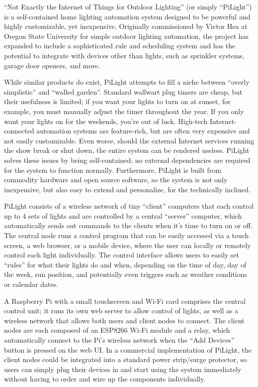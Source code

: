 ``Not Exactly the Internet of Things for Outdoor Lighting'' (or simply
``PiLight'') is a self-contained home lighting automation system designed to be
powerful and highly customizable, yet inexpensive.  Originally commissioned by
Victor Hsu at Oregon State University for simple outdoor lighting automation,
the project has expanded to include a sophisticated rule and scheduling system
and has the potential to integrate with devices other than lights, such as
sprinkler systems, garage door openers, and more.

While similar products do exist, PiLight attempts to fill a niche between
``overly simplistic'' and ``walled garden''.  Standard wallwart plug timers are
cheap, but their usefulness is limited; if you want your lights to turn on at
sunset, for example, you must manually adjust the timer throughout the year.
If you only want your lights on for the weekends, you're out of luck.
High-tech Internet-connected automation systems are feature-rich, but are often
very expensive and not easily customizable.  Even worse, should the external
Internet services running the show break or shut down, the entire system can be
rendered useless.  PiLight solves these issues by being self-contained; no
external dependencies are required for the system to function normally.
Furthermore, PiLight is built from commodity hardware and open source software,
so the system is not only inexpensive, but also easy to extend and personalize,
for the technically inclined.

PiLight consists of a wireless network of tiny ``client'' computers that each
control up to 4 sets of lights and are controlled by a central ``server''
computer, which automatically sends out commands to the clients when it's time
to turn on or off.  The central node runs a control program that can be easily
accessed via a touch screen, a web browser, or a mobile device, where the user
can locally or remotely control each light individually. The control interface
allows users to easily set ``rules'' for what their lights do and when,
depending on the time of day, day of the week, sun position, and potentially
even triggers such as weather conditions or calendar dates.

A Raspberry Pi with a small touchscreen and Wi-Fi card comprises the central
control unit; it runs its own web server to allow control of lights, as well as
a wireless network that allows both users and client nodes to connect.  The
client nodes are each composed of an ESP8266 Wi-Fi module and a relay, which
automatically connect to the Pi's wireless network when the ``Add Devices''
button is pressed on the web UI.  In a commercial implementation of PiLight,
the client nodes could be integrated into a standard power strip/surge
protector, so users can simply plug their devices in and start using the system
immediately without having to order and wire up the components individually.

